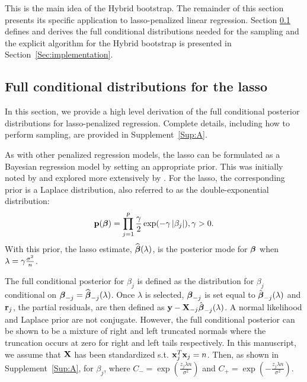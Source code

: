 This is the main idea of the Hybrid bootstrap. The remainder of this section presents its specific application to lasso-penalized linear regression. Section \ref{Sec:full-cond} defines and derives the full conditional distributions needed for the sampling and the explicit algorithm for the Hybrid bootstrap is presented in Section~\ref{Sec:implementation}.

\subsection{Full conditional distributions for the lasso}
\label{Sec:full-cond}

In this section, we provide a high level derivation of the full conditional posterior distributions for lasso-penalized regression. Complete details, including how to perform sampling, are provided in Supplement~\ref{Sup:A}.

As with other penalized regression models, the lasso can be formulated as a Bayesian regression model by setting an appropriate prior. This was initially noted by \cite{Tibshirani1996} and explored more extensively by \cite{Park2008}. For the lasso, the corresponding prior is a Laplace distribution, also referred to as the double-exponential distribution: $$\mathbf{p}(\boldsymbol{\beta}) = \prod_{j = 1}^{p} \frac{\gamma}{2}\exp(-\gamma \left\lvert\beta_j\right\rvert), \gamma > 0.$$ With this prior, the lasso estimate, $\widehat{\boldsymbol{\beta}}(\lambda)$, is the posterior mode for $\boldsymbol{\beta}$ when $\lambda = \gamma \frac{\sigma^2}{n}$.

The full conditional posterior for $\beta_j$ is defined as the distribution for $\beta_j$ conditional on $\boldsymbol{\beta}_{-j} = \widehat{\boldsymbol{\beta}}_{-j}(\lambda)$. Once $\lambda$ is selected, $\boldsymbol{\beta}_{-j}$ is set equal to $\hat{\boldsymbol{\beta}}_{-j}(\lambda)$ and $\mathbf{r}_{j}$, the partial residuals, are then defined as $\mathbf{y} - \mathbf{X}_{-j}\hat{\boldsymbol{\beta}}_{-j}(\lambda)$. A normal likelihood and Laplace prior are not conjugate. However, the full conditional posterior can be shown to be a mixture of right and left truncated normals where the truncation occurs at zero for right and left tails respectively. In this manuscript, we assume that $\mathbf{X}$ has been standardized s.t. $\mathbf{x}_j^T\mathbf{x}_j = n$. Then, as shown in Supplement~\ref{Sup:A}, for $\beta_j$,
where $C_{-} = \exp(\frac{z_j \lambda n}{\sigma^2})$ and $C_{+} = \exp(-\frac{z_j \lambda n}{\sigma^2})$.

